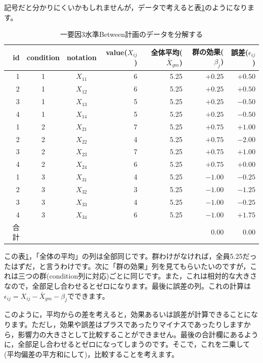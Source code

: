 \documentclass{ltjsarticle}
\begin{document}
記号だと分かりにくいかもしれませんが，データで考えると表\ref{table::21_03}のようになります。
\begin{table}[ht]
    \centering
    \caption{一要因3水準Between計画のデータを分解する}
    \begin{tabular}{rccrrrr}
      \hline
    id & condition & notation & value($X_{ij}$) & 全体平均($\bar{X}_{gm}$) & 群の効果($\beta_j$) & 誤差($\epsilon_{ij}$)\\ 
      \hline
      1 & 1 & $X_{11}$ & 6 & 5.25 & $+0.25$ & $+0.50$\\ 
      2 & 1 & $X_{12}$ & 6 & 5.25 & $+0.25$ & $+0.50$\\ 
      3 & 1 & $X_{13}$ & 5 & 5.25 & $+0.25$ & $-0.50$\\ 
      4 & 1 & $X_{14}$ & 5 & 5.25 & $+0.25$ & $-0.50$\\ 
      1 & 2 & $X_{21}$ & 7 & 5.25 & $+0.75$ & $+1.00$\\ 
      2 & 2 & $X_{22}$ & 4 & 5.25 & $+0.75$ & $-2.00$ \\ 
      3 & 2 & $X_{23}$ & 7 & 5.25 & $+0.75$ & $+1.00$\\ 
      4 & 2 & $X_{24}$ & 6 & 5.25 & $+0.75$ & $+0.00$\\ 
      1 & 3 & $X_{31}$ & 4 & 5.25 & $-1.00$ & $-0.25$\\ 
      2 & 3 & $X_{32}$ & 3 & 5.25 & $-1.00$ & $-1.25$\\ 
      3 & 3 & $X_{33}$ & 4 & 5.25 & $-1.00$ & $-0.25$\\ 
      4 & 3 & $X_{34}$ & 6 & 5.25 & $-1.00$ & $+1.75$\\ 
       \hline\hline
       合計 &&&&& 0.00 & 0.00\\\hline
    \end{tabular}
    \label{table::21_03}
    \end{table}
この表\ref{table::21_03}，「全体の平均」の列は全部同じです。群わけがなければ，全員5.25だったはずだ，と言うわけです。次に「群の効果」列を見てもらいたいのですが，これは三つの群(condition列に対応)ごとに同じです。また，これは相対的な大きさなので，全部足し合わせるとゼロになります。最後に誤差の列。これの計算は$\epsilon_{ij} = X_{ij} - \bar{X}_{gm}-\beta_j$でできます。

このように，平均からの差を考えると，効果あるいは誤差が計算できることになります。ただし，効果や誤差はプラスであったりマイナスであったりしますから，影響力の大きさとして比較することができません。最後の合計欄にあるように，全部足し合わせるとゼロになってしまうのです。そこで，これを二乗して(平均偏差の平方和にして)，比較することを考えます。
\end{document}
